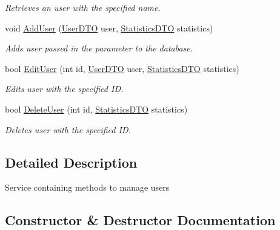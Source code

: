 \begin{DoxyCompactItemize}
\begin{DoxyCompactList}\small\item\em Retrieves an user with the specified name. \end{DoxyCompactList}\item 
void \mbox{\hyperlink{class_gielda_l2_1_1_i_n_f_r_a_s_t_r_u_c_t_u_r_e_1_1_services_1_1_user_service_a0758f1bb59fe3430fc4122347e82bccf}{Add\+User}} (\mbox{\hyperlink{class_gielda_l2_1_1_i_n_f_r_a_s_t_r_u_c_t_u_r_e_1_1_d_t_o_1_1_user_d_t_o}{User\+D\+TO}} user, \mbox{\hyperlink{class_gielda_l2_1_1_i_n_f_r_a_s_t_r_u_c_t_u_r_e_1_1_d_t_o_1_1_statistics_d_t_o}{Statistics\+D\+TO}} statistics)
\begin{DoxyCompactList}\small\item\em Adds user passed in the parameter to the database. \end{DoxyCompactList}\item 
bool \mbox{\hyperlink{class_gielda_l2_1_1_i_n_f_r_a_s_t_r_u_c_t_u_r_e_1_1_services_1_1_user_service_aa50409112230c2fedfeb3f358665496d}{Edit\+User}} (int id, \mbox{\hyperlink{class_gielda_l2_1_1_i_n_f_r_a_s_t_r_u_c_t_u_r_e_1_1_d_t_o_1_1_user_d_t_o}{User\+D\+TO}} user, \mbox{\hyperlink{class_gielda_l2_1_1_i_n_f_r_a_s_t_r_u_c_t_u_r_e_1_1_d_t_o_1_1_statistics_d_t_o}{Statistics\+D\+TO}} statistics)
\begin{DoxyCompactList}\small\item\em Edits user with the specified ID. \end{DoxyCompactList}\item 
bool \mbox{\hyperlink{class_gielda_l2_1_1_i_n_f_r_a_s_t_r_u_c_t_u_r_e_1_1_services_1_1_user_service_ae318cd1c42a95c89d736e3dc1151dddc}{Delete\+User}} (int id, \mbox{\hyperlink{class_gielda_l2_1_1_i_n_f_r_a_s_t_r_u_c_t_u_r_e_1_1_d_t_o_1_1_statistics_d_t_o}{Statistics\+D\+TO}} statistics)
\begin{DoxyCompactList}\small\item\em Deletes user with the specified ID. \end{DoxyCompactList}\end{DoxyCompactItemize}


\subsection{Detailed Description}
Service containing methods to manage users 



\subsection{Constructor \& Destructor Documentation}
\mbox{\label{class_gielda_l2_1_1_i_n_f_r_a_s_t_r_u_c_t_u_r_e_1_1_services_1_1_user_service_a0aab5959c1782b51e9343faae0b76305}} 
